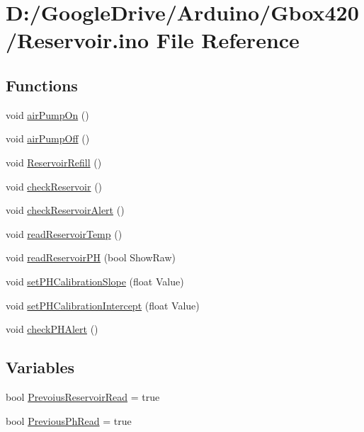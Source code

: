 \hypertarget{_reservoir_8ino}{}\section{D\+:/\+Google\+Drive/\+Arduino/\+Gbox420/\+Reservoir.ino File Reference}
\label{_reservoir_8ino}
\subsection*{Functions}
\begin{DoxyCompactItemize}
\item 
void \mbox{\hyperlink{_reservoir_8ino_abaf5b082db42708d31242604cb3949bc}{air\+Pump\+On}} ()
\item 
void \mbox{\hyperlink{_reservoir_8ino_a9d7fc50335a0dfc970349fe10e10729f}{air\+Pump\+Off}} ()
\item 
void \mbox{\hyperlink{_reservoir_8ino_a06ca90b9184e86f42c4b2af23ec6aff8}{Reservoir\+Refill}} ()
\item 
void \mbox{\hyperlink{_reservoir_8ino_acccd6ce7bdb6313d49ed7e1d15c34ade}{check\+Reservoir}} ()
\item 
void \mbox{\hyperlink{_reservoir_8ino_aef2e5b8e1e004b338fd8a02f634bbcd4}{check\+Reservoir\+Alert}} ()
\item 
void \mbox{\hyperlink{_reservoir_8ino_a1611ada2370af3e62610eefcdb2cf7a8}{read\+Reservoir\+Temp}} ()
\item 
void \mbox{\hyperlink{_reservoir_8ino_a1966fd92f689285f43d071fc9b6cd0a9}{read\+Reservoir\+PH}} (bool Show\+Raw)
\item 
void \mbox{\hyperlink{_reservoir_8ino_a5a85422c02ae9a0c18492be078fab45a}{set\+P\+H\+Calibration\+Slope}} (float Value)
\item 
void \mbox{\hyperlink{_reservoir_8ino_a24d5d5316e33b75bccff61af79ccff8c}{set\+P\+H\+Calibration\+Intercept}} (float Value)
\item 
void \mbox{\hyperlink{_reservoir_8ino_a5f2df42c76b74fa92dc5a734984c5f72}{check\+P\+H\+Alert}} ()
\end{DoxyCompactItemize}
\subsection*{Variables}
\begin{DoxyCompactItemize}
\item 
bool \mbox{\hyperlink{_reservoir_8ino_ad545309f7f16bb9eb70b9b7754376a10}{Prevoius\+Reservoir\+Read}} = true
\item 
bool \mbox{\hyperlink{_reservoir_8ino_aa4f528ca2547773eeb1bd328e0b4ecae}{Previous\+Ph\+Read}} = true
\end{DoxyCompactItemize}


